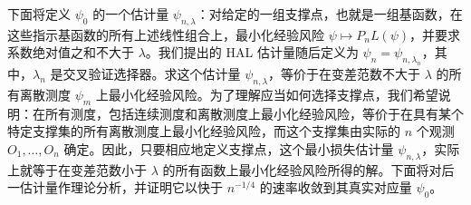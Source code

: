 下面将定义 $\psi_0$ 的一个估计量 $\psi_{n,\lambda}$：对给定的一组支撑点，也就是一组基函数，在这些指示基函数的所有上述线性组合上，最小化经验风险 $\psi\mapsto P_nL(\psi)$，并要求系数绝对值之和不大于 $\lambda$。我们提出的 HAL 估计量随后定义为 $\psi_n=\psi_{n,\lambda_n}$，其中，$\lambda_n$ 是交叉验证选择器。求这个估计量 $\psi_{n,\lambda}$，等价于在变差范数不大于 $\lambda$ 的所有离散测度 $\psi_m$ 上最小化经验风险。为了理解应当如何选择支撑点，我们希望说明：在所有测度，包括连续测度和离散测度上最小化经验风险，等价于在具有某个特定支撑集的所有离散测度上最小化经验风险，而这个支撑集由实际的 $n$ 个观测 $O_1,\ldots,O_n$ 确定。因此，只要相应地定义支撑点，这个最小损失估计量 $\psi_{n,\lambda}$，实际上就等于在变差范数小于 $\lambda$ 的所有函数上最小化经验风险所得的解。下面将对后一估计量作理论分析，并证明它以快于 $n^{-1/4}$ 的速率收敛到其真实对应量 $\psi_0$。
